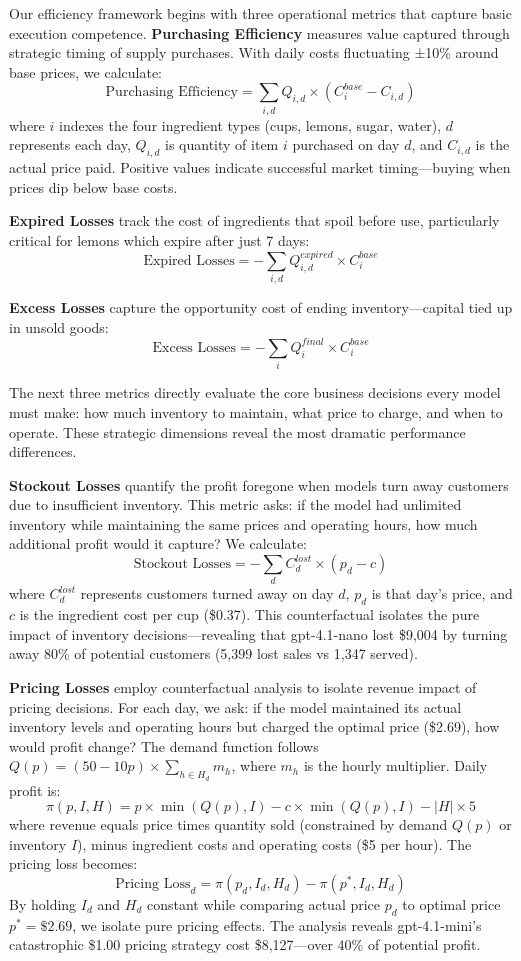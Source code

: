 \documentclass[11pt]{article}
\begin{document}
Our efficiency framework begins with three operational metrics that capture basic execution competence. \textbf{Purchasing Efficiency} measures value captured through strategic timing of supply purchases. With daily costs fluctuating ±10\% around base prices, we calculate:
$$\text{Purchasing Efficiency} = \sum_{i,d} Q_{i,d} \times (C_i^{base} - C_{i,d})$$
where $i$ indexes the four ingredient types (cups, lemons, sugar, water), $d$ represents each day, $Q_{i,d}$ is quantity of item $i$ purchased on day $d$, and $C_{i,d}$ is the actual price paid. Positive values indicate successful market timing—buying when prices dip below base costs.

\textbf{Expired Losses} track the cost of ingredients that spoil before use, particularly critical for lemons which expire after just 7 days:
$$\text{Expired Losses} = -\sum_{i,d} Q_{i,d}^{expired} \times C_i^{base}$$

\textbf{Excess Losses} capture the opportunity cost of ending inventory—capital tied up in unsold goods:
$$\text{Excess Losses} = -\sum_i Q_i^{final} \times C_i^{base}$$

The next three metrics directly evaluate the core business decisions every model must make: how much inventory to maintain, what price to charge, and when to operate. These strategic dimensions reveal the most dramatic performance differences.

\textbf{Stockout Losses} quantify the profit foregone when models turn away customers due to insufficient inventory. This metric asks: if the model had unlimited inventory while maintaining the same prices and operating hours, how much additional profit would it capture? We calculate:
$$\text{Stockout Losses} = -\sum_d C_d^{lost} \times (p_d - c)$$
where $C_d^{lost}$ represents customers turned away on day $d$, $p_d$ is that day's price, and $c$ is the ingredient cost per cup (\$0.37). This counterfactual isolates the pure impact of inventory decisions—revealing that gpt-4.1-nano lost \$9,004 by turning away 80\% of potential customers (5,399 lost sales vs 1,347 served).

\textbf{Pricing Losses} employ counterfactual analysis to isolate revenue impact of pricing decisions. For each day, we ask: if the model maintained its actual inventory levels and operating hours but charged the optimal price (\$2.69), how would profit change? The demand function follows $Q(p) = (50 - 10p) \times \sum_{h \in H_d} m_h$, where $m_h$ is the hourly multiplier. Daily profit is:
$$\pi(p, I, H) = p \times \min(Q(p), I) - c \times \min(Q(p), I) - |H| \times 5$$
where revenue equals price times quantity sold (constrained by demand $Q(p)$ or inventory $I$), minus ingredient costs and operating costs (\$5 per hour). The pricing loss becomes:
$$\text{Pricing Loss}_d = \pi(p_d, I_d, H_d) - \pi(p^*, I_d, H_d)$$
By holding $I_d$ and $H_d$ constant while comparing actual price $p_d$ to optimal price $p^* = \$2.69$, we isolate pure pricing effects. The analysis reveals gpt-4.1-mini's catastrophic \$1.00 pricing strategy cost \$8,127—over 40\% of potential profit.
\end{document}
